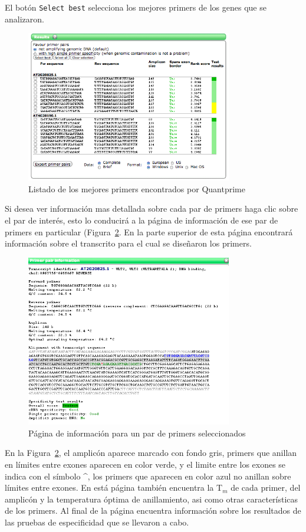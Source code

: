 \documentclass[letter,11pt]{book}
\begin{document}
El botón \Verb+Select best+ selecciona los mejores primers de los genes que se analizaron. 

\begin{figure}[h!]
\centering
 \includegraphics[width=9cm]{Figs/QP_results.png}
 \caption{\label{fig:QP_results}Listado de los mejores primers encontrados por {\sc Quantprime}}
\end{figure}

Si desea ver información mas detallada sobre cada par de primers haga clic sobre el par de interés, esto lo conducirá a la página de información de ese par de primers en particular (Figura~\ref{fig:QP_primerinfo}. En la parte superior de esta página encontrará información sobre el transcrito para el cual se diseñaron los primers.

\begin{figure}[h!]
\centering
 \includegraphics[width=9cm]{Figs/QP_primerinfo.png}
 \caption{\label{fig:QP_primerinfo}Página de información para un par de primers seleccionados}
\end{figure}

En la Figura~\ref{fig:QP_primerinfo}, el amplicón aparece marcado con fondo gris, primers que anillan en límites entre exones aparecen en color verde, y el limite entre los exones se indica con el símbolo \textasciicircum, los primers que aparecen en color azul no anillan sobre límites entre exones. En está página también encuentra la T$_m$ de cada primer, del amplicón y la temperatura óptima de anillamiento, asi como otras características de los primers. Al final de la página encuentra información sobre los resultados de las pruebas de especificidad que se llevaron  a cabo.
\end{document}

